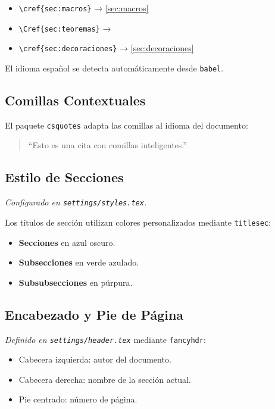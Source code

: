 \documentclass[/work/src/main.tex]{subfiles}
\begin{document}
\begin{itemize}
    \item \texttt{\textbackslash cref\{sec:macros\}} → \cref{sec:macros}
    \item \texttt{\textbackslash Cref\{sec:teoremas\}} → 
    \item \texttt{\textbackslash cref\{sec:decoraciones\}} → \cref{sec:decoraciones}
\end{itemize}

El idioma español se detecta automáticamente desde \texttt{babel}.

\subsection{Comillas Contextuales}
\label{sec:csquotes}

El paquete \texttt{csquotes} adapta las comillas al idioma del documento:

\begin{quote}
    \enquote{Esto es una cita con comillas inteligentes.}
\end{quote}

\subsection{Estilo de Secciones}
\label{sec:estilo}

\emph{Configurado en \texttt{settings/styles.tex}.}

Los títulos de sección utilizan colores personalizados mediante \texttt{titlesec}:

\begin{itemize}
    \item \textcolor{sectioncolor}{\textbf{Secciones}} en azul oscuro.
    \item \textcolor{subsectioncolor}{\textbf{Subsecciones}} en verde azulado.
    \item \textcolor{subsubsectioncolor}{\textbf{Subsubsecciones}} en púrpura.
\end{itemize}

\subsection{Encabezado y Pie de Página}
\label{sec:header}

\emph{Definido en \texttt{settings/header.tex}} mediante \texttt{fancyhdr}:

\begin{itemize}
    \item Cabecera izquierda: autor del documento.
    \item Cabecera derecha: nombre de la sección actual.
    \item Pie centrado: número de página.
\end{itemize}
\end{document}
